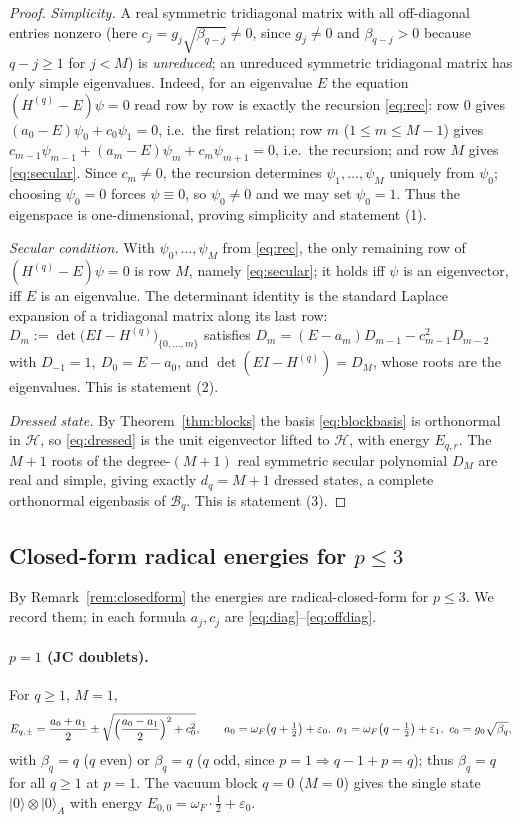 \documentclass[12pt]{article}
\theoremstyle{definition}
\theoremstyle{remark}
\newcommand{\ket}[1]{\lvert #1\rangle}
\begin{document}
\begin{proof}
\emph{Simplicity.} A real symmetric tridiagonal matrix with all off-diagonal
entries nonzero (here $c_j=g_j\sqrt{\beta_{q-j}}\neq0$, since $g_j\neq0$ and
$\beta_{q-j}>0$ because $q-j\ge1$ for $j<M$) is \emph{unreduced}; an unreduced
symmetric tridiagonal matrix has only simple eigenvalues. Indeed, for an eigenvalue
$E$ the equation $(H^{(q)}-E)\psi=0$ read row by row is exactly the recursion
\eqref{eq:rec}: row $0$ gives $(a_0-E)\psi_0+c_0\psi_1=0$, i.e.\ the first relation;
row $m$ ($1\le m\le M-1$) gives $c_{m-1}\psi_{m-1}+(a_m-E)\psi_m+c_m\psi_{m+1}=0$,
i.e.\ the recursion; and row $M$ gives \eqref{eq:secular}. Since $c_m\neq0$, the
recursion determines $\psi_1,\dots,\psi_M$ uniquely from $\psi_0$; choosing
$\psi_0=0$ forces $\psi\equiv0$, so $\psi_0\neq0$ and we may set $\psi_0=1$. Thus
the eigenspace is one-dimensional, proving simplicity and statement (1).

\emph{Secular condition.} With $\psi_0,\dots,\psi_M$ from \eqref{eq:rec}, the only
remaining row of $(H^{(q)}-E)\psi=0$ is row $M$, namely \eqref{eq:secular}; it holds
iff $\psi$ is an eigenvector, iff $E$ is an eigenvalue. The determinant identity is
the standard Laplace expansion of a tridiagonal matrix along its last row:
$D_m:=\det\bigl(EI-H^{(q)}\bigr)_{\{0,\dots,m\}}$ satisfies
$D_m=(E-a_m)D_{m-1}-c_{m-1}^2D_{m-2}$ with $D_{-1}=1,\ D_0=E-a_0$, and
$\det(EI-H^{(q)})=D_M$, whose roots are the eigenvalues. This is statement (2).

\emph{Dressed state.} By Theorem~\ref{thm:blocks} the basis \eqref{eq:blockbasis} is
orthonormal in $\mathcal H$, so \eqref{eq:dressed} is the unit eigenvector lifted to
$\mathcal H$, with energy $E_{q,r}$. The $M+1$ roots of the degree-$(M+1)$ real
symmetric secular polynomial $D_M$ are real and simple, giving exactly $d_q=M+1$
dressed states, a complete orthonormal eigenbasis of $\mathcal B_q$. This is
statement (3).
\end{proof}

\subsection{Closed-form radical energies for $p\le3$}\label{sec:radical}

By Remark~\ref{rem:closedform} the energies are radical-closed-form for $p\le3$. We
record them; in each formula $a_j,c_j$ are \eqref{eq:diag}--\eqref{eq:offdiag}.

\paragraph{$p=1$ (JC doublets).} For $q\ge1$, $M=1$,
\begin{equation}\label{eq:p1}
E_{q,\pm}=\frac{a_0+a_1}{2}\pm\sqrt{\Bigl(\frac{a_0-a_1}{2}\Bigr)^2+c_0^2},\qquad
a_0=\omega_F\bigl(q+\tfrac12\bigr)+\varepsilon_0,\ a_1=\omega_F\bigl(q-\tfrac12\bigr)+\varepsilon_1,\ c_0=g_0\sqrt{\beta_q},
\end{equation}
with $\beta_q=q$ ($q$ even) or $\beta_q=q$ ($q$ odd, since $p=1\Rightarrow q-1+p=q$);
thus $\beta_q=q$ for all $q\ge1$ at $p=1$. The vacuum block $q=0$ ($M=0$) gives the
single state $\ket0\otimes\ket0_A$ with energy $E_{0,0}=\omega_F\cdot\tfrac12+\varepsilon_0$.
\end{document}

